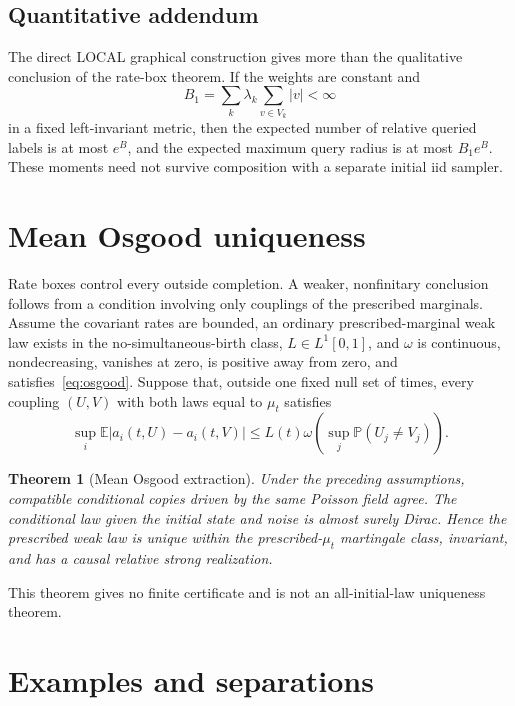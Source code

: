 \documentclass[11pt]{article}
\newtheorem{theorem}{Theorem}[section]
\theoremstyle{definition}
\theoremstyle{remark}
\newcommand{\E}{\mathbb{E}}
\newcommand{\Pp}{\mathbb{P}}
\newcommand{\1}{\mathbf{1}}
\begin{document}
\subsection{Quantitative addendum}

The direct LOCAL graphical construction gives more than the qualitative
conclusion of the rate-box theorem.  If the weights are constant and
\[
 B_1=\sum_k\lambda_k\sum_{v\in V_k}|v|<\infty
\]
in a fixed left-invariant metric, then the expected number of relative queried
labels is at most $e^B$, and the expected maximum query radius is at most
$B_1e^B$.  These moments need not survive composition with a separate initial
iid sampler.

\section{Mean Osgood uniqueness}

Rate boxes control every outside completion.  A weaker, nonfinitary conclusion
follows from a condition involving only couplings of the prescribed marginals.
Assume the covariant rates are bounded, an ordinary prescribed-marginal weak
law exists in the no-simultaneous-birth class, $L\in L^1[0,1]$, and
$\omega$ is continuous, nondecreasing, vanishes at zero, is positive away
from zero, and satisfies~\eqref{eq:osgood}.  Suppose that, outside one fixed
null set of times, every coupling $(U,V)$ with both laws equal to $\mu_t$
satisfies
\begin{equation}
 \sup_i\E|a_i(t,U)-a_i(t,V)|
 \le L(t)\omega\!\left(\sup_j\Pp(U_j\ne V_j)\right).
 \label{eq:mean}
\end{equation}

\begin{theorem}[Mean Osgood extraction]
Under the preceding assumptions, compatible conditional copies driven by the
same Poisson field agree.  The conditional law given the initial state and
noise is almost surely Dirac.  Hence the prescribed weak law is unique within
the prescribed-$\mu_t$ martingale class, invariant, and has a causal relative
strong realization.
\end{theorem}

This theorem gives no finite certificate and is not an all-initial-law
uniqueness theorem.

\section{Examples and separations}
\end{document}

